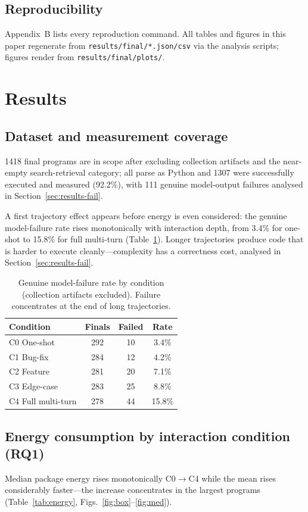\documentclass[journal]{IEEEtran}
\begin{document}
\subsection{Reproducibility}
Appendix~B lists every reproduction command. All tables and figures in this
paper regenerate from \texttt{results/final/*.json/csv} via the analysis
scripts; figures render from \texttt{results/final/plots/}.

\section{Results}\label{sec:results}
\subsection{Dataset and measurement coverage}
1418 final programs are in scope after excluding collection artifacts and the
near-empty search-retrieval category; all parse as Python and 1307 were
successfully executed and measured (92.2\%), with 111 genuine model-output
failures analysed in Section~\ref{sec:results-fail}.

A first trajectory effect appears before energy is even considered: the
genuine model-failure rate rises monotonically with interaction depth, from
3.4\% for one-shot to 15.8\% for full multi-turn
(Table~\ref{tab:failrate}). Longer
trajectories produce code that is harder to execute cleanly---complexity has
a correctness cost, analysed in Section~\ref{sec:results-fail}.

\begin{table}[htbp]
\caption{Genuine model-failure rate by condition (collection artifacts
excluded). Failure concentrates at the end of long trajectories.}
\label{tab:failrate}
\centering
\begin{tabular}{lccc}
\toprule
Condition & Finals & Failed & Rate \\
\midrule
C0 One-shot & 292 & 10 & 3.4\% \\
C1 Bug-fix & 284 & 12 & 4.2\% \\
C2 Feature & 281 & 20 & 7.1\% \\
C3 Edge-case & 283 & 25 & 8.8\% \\
C4 Full multi-turn & 278 & 44 & 15.8\% \\
\bottomrule
\end{tabular}
\end{table}

\subsection{Energy consumption by interaction condition (RQ1)}
Median package energy rises monotonically C0$\rightarrow$C4 while the mean
rises considerably faster---the increase concentrates in the largest
programs (Table~\ref{tab:energy}, Figs.~\ref{fig:box}--\ref{fig:med}).
\end{document}
